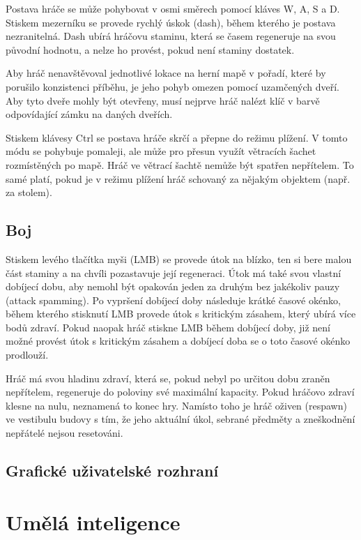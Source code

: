 \documentclass[FM,Proj]{tulthesis}
\begin{document}
	Postava hráče se může pohybovat v osmi směrech pomocí kláves W, A, S a D. Stiskem mezerníku se provede rychlý úskok (dash), během kterého je postava nezranitelná. Dash ubírá hráčovu staminu, která se časem regeneruje na svou původní hodnotu, a nelze ho provést, pokud není staminy dostatek.
	
	Aby hráč nenavštěvoval jednotlivé lokace na herní mapě v pořadí, které by porušilo konzistenci příběhu, je jeho pohyb omezen pomocí uzamčených dveří. Aby tyto dveře mohly být otevřeny, musí nejprve hráč nalézt klíč v barvě odpovídající zámku na daných dveřích.
	
	Stiskem klávesy Ctrl se postava hráče skrčí a přepne do režimu plížení. V tomto módu se pohybuje pomaleji, ale může pro přesun využít větracích šachet rozmístěných po mapě. Hráč ve větrací šachtě nemůže být spatřen nepřítelem. To samé platí, pokud je v režimu plížení hráč schovaný za nějakým objektem (např. za stolem).
	
	\subsection{Boj} %
	
	Stiskem levého tlačítka myši (LMB) se provede útok na blízko, ten si bere malou část staminy a na chvíli pozastavuje její regeneraci. Útok má také svou vlastní dobíjecí dobu, aby nemohl být opakován jeden za druhým bez jakékoliv pauzy (attack spamming). Po vypršení dobíjecí doby následuje krátké časové okénko, během kterého stisknutí LMB provede útok s kritickým zásahem, který ubírá více bodů zdraví. Pokud naopak hráč stiskne LMB během dobíjecí doby, již není možné provést útok s kritickým zásahem a dobíjecí doba se o toto časové okénko prodlouží.
	
	Hráč má svou hladinu zdraví, která se, pokud nebyl po určitou dobu zraněn nepřítelem, regeneruje do poloviny své maximální kapacity. Pokud hráčovo zdraví klesne na nulu, neznamená to konec hry. Namísto toho je hráč oživen (respawn) ve vestibulu budovy s tím, že jeho aktuální úkol, sebrané předměty a zneškodnění nepřátelé nejsou resetováni.
		
	\subsection{Grafické uživatelské rozhraní} %
	
	\section{Umělá inteligence}	
	
\end{document}
